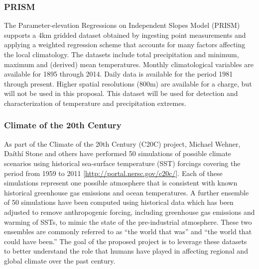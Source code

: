 \documentclass[11pt]{article}
\begin{document}
\subsubsection*{PRISM} \label{sec:PRISM}

The Parameter-elevation Regressions on Independent Slopes Model (PRISM) \citep{daly2008physiographically} supports a 4km gridded dataset obtained by ingesting point measurements and applying a weighted regression scheme that accounts for many factors affecting the local climatology.  The datasets include total precipitation and minimum, maximum and (derived) mean temperatures.  Monthly climatological variables are available for 1895 through 2014.  Daily data is available for the period 1981 through present.  Higher spatial resolutions (800m) are available for a charge, but will not be used in this proposal.  This dataset will be used for detection and characterization of temperature and precipitation extremes.




\subsubsection*{Climate of the 20th Century} \label{sec:EnsembleData}

As part of the Climate of the 20th Century (C20C) project, Michael Wehner, Da\'ith\'i Stone and others have performed 50 simulations of possible climate scenarios using historical sea-surface temperature (SST) forcings covering the period from 1959 to 2011 [\url{http://portal.nersc.gov/c20c/}].  Each of these simulations represent one possible atmosphere that is consistent with known historical greenhouse gas emissions and ocean temperatures.  A further ensemble of 50 simulations have been computed using historical data which has been adjusted to remove anthropogenic forcing, including greenhouse gas emissions and warming of SSTs, to mimic the state of the pre-industrial atmosphere.  These two ensembles are commonly referred to as ``the world that was'' and ``the world that could have been.''  The goal of the proposed project is to leverage these datasets to better understand the role that humans have played in affecting regional and global climate over the past century.
\end{document}
